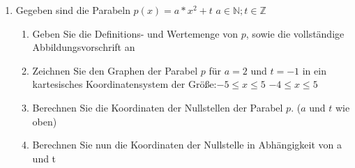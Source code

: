 \documentclass{scrartcl}
\begin{document}
	
	
		\begin{enumerate}
			\item Gegeben sind die Parabeln $p(x) = a*x^2 + t$ \quad \quad $a \in \mathbb{N}; t \in \mathbb{Z}$
				\begin{enumerate}
					\item Geben Sie die Definitions- und Wertemenge von $p$, sowie die vollständige Abbildungsvorschrift an
					\item Zeichnen Sie den Graphen der Parabel $p$ für $a=2$ und $t = -1$ in ein kartesisches Koordinatensystem der Größe:\quad $ -5 \leq x \leq 5 $ \quad $-4 \leq x \leq 5$ 
					\item Berechnen Sie die Koordinaten der Nullstellen der Parabel $p$. ($a$ und $t$ wie oben)
					\item Berechnen Sie nun die Koordinaten der Nullstelle in Abhängigkeit von a und t \\
				\end{enumerate}	
		\end{enumerate} 
\end{document}
